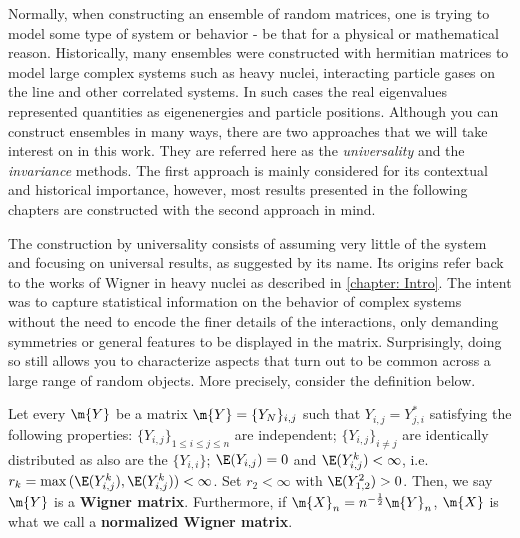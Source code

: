 Normally, when constructing an ensemble of random matrices, one is trying to model some type of system or behavior -  be that for a physical or mathematical reason. Historically, many ensembles were constructed with hermitian matrices to model large complex systems such as heavy nuclei, interacting particle gases on the line and other correlated systems. In such cases the real eigenvalues represented quantities as eigenenergies and particle positions. Although you can construct ensembles in many ways, there are two approaches that we will take interest on in this work. They are referred here as the \textit{universality} and the \textit{invariance} methods. The first approach is mainly considered for its contextual and historical importance, however, most results presented in the following chapters are constructed with the second approach in mind.

The construction by universality consists of assuming very little of the system and focusing on universal results, as suggested by its name. Its origins refer back to the works of Wigner in heavy nuclei as described in \autoref{chapter: Intro}. The intent was to capture statistical information on the behavior of complex systems without the need to encode the finer details of the interactions, only demanding symmetries or general features to be displayed in the matrix. Surprisingly, doing so still allows you to characterize aspects that turn out to be common across a large range of random objects. More precisely, consider the definition below.

\begin{definicao}	\label{Definition: Wigner Matrix}
	Let every $\m{Y}$ be a matrix $\m{Y} = \{Y_N\}_{i,j}$ such that $Y_{i,j} = Y_{j,i}^*$ satisfying the following properties: $\{Y_{i,j}\}_{1\leq i \leq j \leq n}$ are independent; $\{Y_{i,j}\}_{i \neq j}$ are identically distributed as also are the $\{Y_{i,i}\}$; $\E(Y_{i,j}) = 0$ and $ \E(Y_{i,j}^k)< \infty$, i.e. $r_k = \max{(\E(Y_{i,j}^k), \E(Y_{i,j}^k))} < \infty$. Set $r_2 < \infty$ with $\E(Y_{1,2}^2) > 0$. Then, we say $\m{Y}$ is a \textbf{Wigner matrix}. Furthermore, if $\m{X}_n = n^{-\frac{1}{2}} \m{Y}_n$, $\m{X}$ is what we call a \textbf{normalized Wigner matrix}.
\end{definicao}

